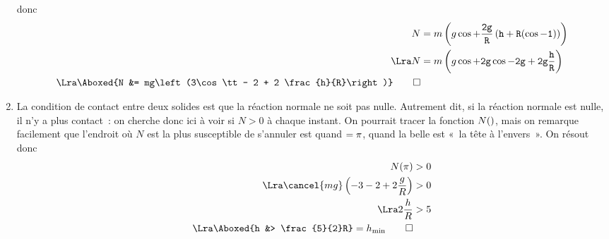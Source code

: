 \documentclass[a4paper, 12pt, final, garamond]{book}
\begin{document}
\begin{enumerate}
        donc
        \begin{align*}
            N &= m\left(g\cos\tt + \frac{2g}{R}\left(h+R(\cos\tt-1)\right)\right)
            \\\Lra
            N &= m\left(g\cos\tt + 2g\cos\tt -2g + 2g \frac{h}{R}\right)
            \\\Lra
            \Aboxed{N &= mg\left(3\cos\tt - 2 + 2 \frac{h}{R}\right)}
            \qed
        \end{align*}
    \item La condition de contact entre deux solides est que la réaction normale
        ne soit pas nulle. Autrement dit, si la réaction normale est nulle, il
        n'y a plus contact~: on cherche donc ici à voir si $N > 0$ à chaque
        instant. On pourrait tracer la fonction $N(\tt)$, mais on remarque
        facilement que l'endroit où $N$ est la plus susceptible de s'annuler est
        quand $\tt = \pi$, quand la belle est «~la tête à l'envers~». On résout
        donc
        \begin{align*}
            N(\pi) &> 0
            \\\Lra
            \cancel{mg}\left(-3-2+2\frac{g}{R}\right) &> 0
            \\\Lra
            2\frac{h}{R} &> 5
            \\\Lra
            \Aboxed{h &> \frac{5}{2}R} = h_{\min}
            \qed
        \end{align*}
\end{enumerate}
\end{document}
